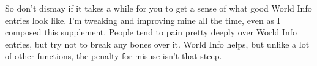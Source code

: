 \documentclass[Source-main.tex]{subfiles}
\begin{document}
So don’t dismay if it takes a while for you to get a sense of what good World Info entries look like.
I’m tweaking and improving mine all the time, even as I composed this supplement.
People tend to pain pretty deeply over World Info entries, but try not to break any bones over it.
World Info helps, but unlike a lot of other functions, the penalty for misuse isn’t that steep.
\end{document}
